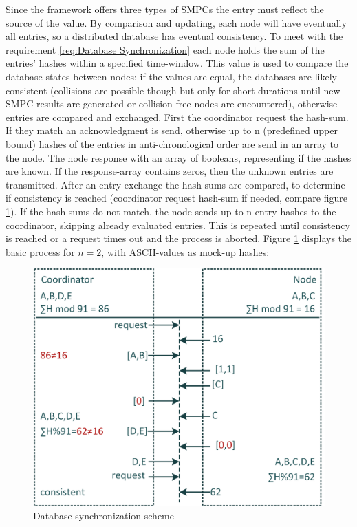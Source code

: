 		Since the framework offers three types of \glspl{SMPC} the entry must reflect the source of the value. By comparison and updating, each node will have eventually all entries, so a distributed database has eventual consistency.
		To meet with the requirement \ref{req:Database Synchronization} each node holds the sum of the entries' hashes within a specified time-window. This value is used to compare the database-states between nodes: if the values are equal, the databases are likely consistent (collisions are possible though but only for short durations until new \gls{SMPC} results are generated or collision free nodes are encountered), otherwise entries are compared and exchanged. First the coordinator request the hash-sum. If they match an acknowledgment is send, otherwise up to n (predefined upper bound) hashes of the entries in anti-chronological order are send in an array to the node. The node response with an array of booleans, representing if the hashes are known. If the response-array contains zeros, then the unknown entries are transmitted. After an entry-exchange the hash-sums are compared, to determine if consistency is reached (coordinator request hash-sum if needed, compare figure \ref{figure:Database synchronization scheme}). If the hash-sums do not match, the node sends up to n entry-hashes to the coordinator, skipping already evaluated entries. This is repeated until consistency is reached or a request times out and the process is aborted.
		Figure \ref{figure:Database synchronization scheme} displays the basic process for $n=2$, with ASCII-values as mock-up hashes:
		
		\begin{figure}[!htbp] %
			\caption{Database synchronization scheme} \label{figure:Database synchronization scheme}
			\includegraphics[scale=1.0]{figures/db-synchronization-ion.png}
		\end{figure}
		
